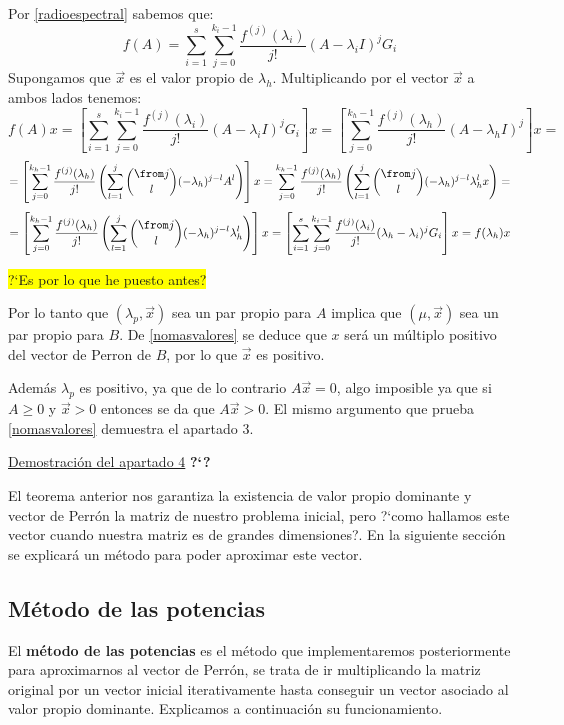 \documentclass[size=a4, parskip=half, titlepage=false, toc=flat, toc=bib, 12pt]{scrartcl}
\makeatletter
\renewenvironment{proof}[1][\proofname] {\par\pushQED{\qed}\normalfont\topsep6\p@\@plus6\p@\relax\trivlist\item[\hskip\labelsep\itshape\tgpaella#1\@addpunct{.}]\ignorespaces}{\popQED\endtrivlist\@endpefalse}
\theoremstyle{theorem-style}
\theoremstyle{definition-style}
\theoremstyle{remark-style}
\theoremstyle{example-style}
\theoremstyle{definition-style}
\theoremstyle{remark-style}
\makeatother
\begin{document}
\begin{proof}
Por \ref{radioespectral} sabemos que:
$$f(A) = \sum_{i = 1}^s \sum_{j = 0}^{k_i -1} \frac{f^{(j)}(\lambda_i)}{j!} (A - \lambda_iI)^j G_i$$
Supongamos que $\vec{x}$ es el valor propio de $\lambda_h$. Multiplicando por el vector $\vec{x}$ a ambos lados tenemos:
$$f(A)x = \left[\sum_{i = 1}^s \sum_{j = 0}^{k_i -1} \frac{f^{(j)}(\lambda_i)}{j!} (A - \lambda_iI)^j G_i \right] x = \left[ \sum_{j = 0}^{k_h -1} \frac{f^{(j)}(\lambda_h)}{j!} (A - \lambda_hI)^j \right] x = $$ $$ = \left[ \sum_{j = 0}^{k_h - 1} \frac{f^{(j)}(\lambda_h)}{j!} \left( \sum_{l = 1}^j {\from j \choose l} (-\lambda_h)^{j-l} A^l \right) \right]x = \sum_{j = 0}^{k_h - 1} \frac{f^{(j)}(\lambda_h)}{j!} \left( \sum_{l = 1}^j {\from j \choose l} (-\lambda_h)^{j-l} \lambda_h^l x \right) = $$ $$=  \left[ \sum_{j = 0}^{k_h - 1} \frac{f^{(j)}(\lambda_h)}{j!} \left( \sum_{l = 1}^j {\from j \choose l} (-\lambda_h)^{j-l} \lambda_h^l \right) \right]x = \left[\sum_{i = 1}^s \sum_{j = 0}^{k_i -1} \frac{f^{(j)}(\lambda_i)}{j!} (\lambda_h - \lambda_i)^j G_i \right] x = f(\lambda_h)x $$
\begin{center} \colorbox{yellow}{?`Es por lo que he puesto antes?} \end{center}
Por lo tanto que $(\lambda_p, \vec{x})$ sea un par propio para $A$ implica que $(\mu, \vec{x})$ sea un par propio para $B$. De \ref{nomasvalores} se deduce que $x$ será un múltiplo positivo del vector de Perron de $B$, por lo que $\vec{x}$ es positivo.

Además $\lambda_p$ es positivo, ya que de lo contrario $A\vec{x} = 0$, algo imposible ya que si $A \geq 0$ y $\vec{x} > 0$ entonces se da que $A\vec{x} > 0$. El mismo argumento que prueba \ref{nomasvalores}
demuestra el apartado 3.
\end{proof}

\underline{Demostración del apartado 4}
\textbf{?`?}

El teorema anterior nos garantiza la existencia de valor propio dominante y vector de Perrón la matriz de nuestro problema inicial, pero ?`como hallamos este vector cuando nuestra matriz es de grandes dimensiones?. En la siguiente sección se explicará un método para poder aproximar este vector.

\newpage

\subsection{Método de las potencias}

El \textbf{método de las potencias} es el método que implementaremos posteriormente para aproximarnos al vector de Perrón, se trata de ir multiplicando la matriz original por un vector inicial iterativamente hasta conseguir un vector asociado al valor propio dominante. Explicamos a continuación su funcionamiento.
\end{document}
